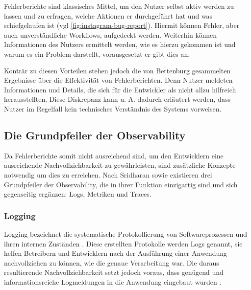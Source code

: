 Fehlerberichte sind klassisches Mittel, um den Nutzer selbst aktiv werden zu lassen und zu erfragen, welche Aktionen er durchgeführt hat und was schiefgelaufen ist (vgl \autoref{fig:instagram-bug-report}). Hiermit können Fehler, aber auch unverständliche Workflows, aufgedeckt werden. Weiterhin können Informationen des Nutzers ermittelt werden, wie es hierzu gekommen ist und warum es ein Problem darstellt, vorausgesetzt er gibt dies an.

Konträr zu diesen Vorteilen stehen jedoch die von Bettenburg \etal \cite{WhatMakesAGoodBugReport} gesammelten Ergebnisse über die Effektivität von Fehlerberichten. Denn Nutzer meldeten Informationen und Details, die sich für die Entwickler als nicht allzu hilfreich herausstellten. Diese Diskrepanz kann u. A. dadurch erläutert werden, dass Nutzer im Regelfall kein technisches Verständnis des Systems vorweisen.

\subsection{Die Grundpfeiler der Observability}

Da Fehlerberichte somit nicht ausreichend sind, um den Entwicklern eine ausreichende Nachvollziehbarkeit zu gewährleisten, sind zusätzliche Konzepte notwendig um dies zu erreichen. Nach Sridharan \etal \cite{DistributedSystemsObservability} sowie \cite{TraefikLogsRequestTracingAndMetrics} \cite{IntrospectiveOfTheCloudManagementToolbox} \cite{MultilevelObservabilityInCloudOrchestration} existieren drei Grundpfeiler der Observability, die in ihrer Funktion einzigartig sind und sich gegenseitig ergänzen: Logs, Metriken und Traces.

\subsubsection{Logging}


Logging bezeichnet die systematische Protokollierung von Softwareprozessen und ihren internen Zuständen \cite{LearningToLog}. Diese erstellten Protokolle werden Logs genannt, sie helfen Betreibern und Entwicklern nach der Ausführung einer Anwendung nachvollziehen zu können, wie die genaue Verarbeitung war. Die daraus resultierende Nachvollziehbarkeit setzt jedoch voraus, dass genügend und informationsreiche Logmeldungen in die Anwendung eingebaut wurden \cite{LearningToLog}.

